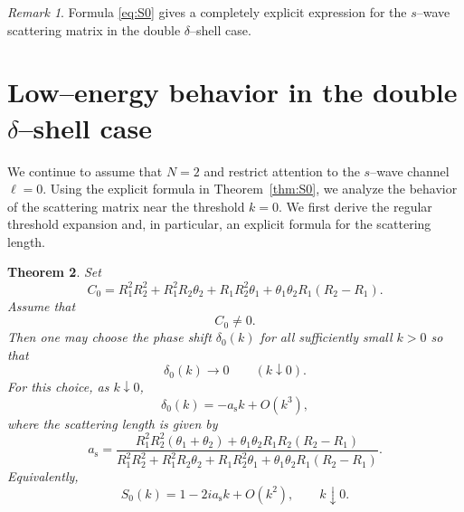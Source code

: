 \documentclass[a4paper,11pt]{article}
\numberwithin{equation}{section}
\newtheorem{thm}{Theorem}[section]
\theoremstyle{definition}
\theoremstyle{remark}
\newtheorem{rem}[thm]{Remark}
\begin{document}
\begin{rem}
Formula \eqref{eq:S0} gives a completely explicit expression for the
$s$--wave scattering matrix in the double $\delta$--shell case.
\end{rem}
\section{Low--energy behavior in the double $\delta$--shell case}
\label{sec:low}

We continue to assume that $N=2$ and restrict attention to the $s$--wave
channel $\ell=0$. Using the explicit formula in
Theorem~\ref{thm:S0}, we analyze the behavior of the scattering matrix near
the threshold $k=0$. We first derive the regular threshold expansion and, in
particular, an explicit formula for the scattering length.

\begin{thm}
\label{thm:regular-threshold}
Set
\begin{equation}\label{eq:C0}
C_0
=
R_1^2R_2^2
+
R_1^2R_2\theta_2
+
R_1R_2^2\theta_1
+
\theta_1\theta_2R_1(R_2-R_1).
\end{equation}
Assume that
$$
C_0\neq0.
$$
Then one may choose the phase shift $\delta_0(k)$ for all sufficiently small
$k>0$ so that
$$
\delta_0(k)\to0
\qquad (k\downarrow0).
$$
For this choice, as $k\downarrow0$,
\begin{equation}\label{eq:delta0-low}
\delta_0(k)=-a_{\mathrm s}k+O(k^3),
\end{equation}
where the scattering length is given by
\begin{equation}\label{eq:scatt-length}
a_{\mathrm s}
=
\frac{
R_1^2R_2^2(\theta_1+\theta_2)
+
\theta_1\theta_2R_1R_2(R_2-R_1)
}{
R_1^2R_2^2
+
R_1^2R_2\theta_2
+
R_1R_2^2\theta_1
+
\theta_1\theta_2R_1(R_2-R_1)
}.
\end{equation}
Equivalently,
\begin{equation}\label{eq:S0-low}
S_0(k)=1-2ia_{\mathrm s}k+O(k^2),
\qquad
k\downarrow0.
\end{equation}
\end{thm}
\end{document}

